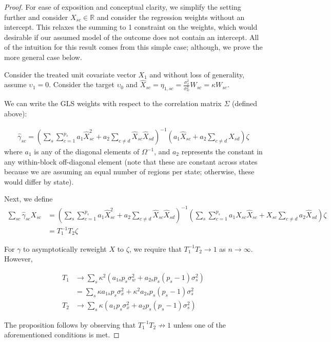 \begin{proof}
For ease of exposition and conceptual clarity, we simplify the setting further and consider $X_{sc} \in \mathbb{R}$ and consider the regression weights without an intercept. This relaxes the summing to 1 constraint on the weights, which would desirable if our assumed model of the outcome does not contain an intercept. All of the intuition for this result comes from this simple case; although, we prove the more general case below.

Consider the treated unit covariate vector $X_1$ and without loss of generality, assume $\upsilon_1 = 0$. Consider the target $\upsilon_0$ and $\hat{X}_{sc} = \eta_{1, sc} = \frac{\sigma^2_x}{\sigma^2_w}W_{sc} = \kappa W_{sc}$. 

We can write the GLS weights with respect to the correlation matrix $\Sigma$ (defined above):

\begin{align*}
\hat{\gamma}_{sc} = (\sum_{s}\sum_{c=1}^{p_s} a_{1} \hat{X}_{sc}^2 + a_{2} \sum_{c\ne d} \hat{X}_{sc}\hat{X}_{sd})^{-1}(a_{1}\hat{X}_{sc} + a_{2}\sum_{c\ne d} \hat{X}_{sd})\zeta
\end{align*}
%
where $a_1$ is any of the diagonal elements of $\Omega^{-1}$, and $a_2$ represents the constant in any within-block off-diagonal element (note that these are constant across states because we are assuming an equal number of regions per state; otherwise, these would differ by state).

Next, we define 
    \begin{align*}
        \sum_{sc} \hat{\gamma}_{sc} X_{sc} &= (\sum_{s}\sum_{c=1}^{p_s} a_{1} \hat{X}_{sc}^2 + a_{2} \sum_{c\ne d} \hat{X}_{sc}\hat{X}_{sd})^{-1}(\sum_{s}\sum_{c=1}^{p_s}a_{1}X_{sc}\hat{X}_{sc} + X_{sc}\sum_{c\ne d}a_{2}\hat{X}_{sd})\zeta \\
        &= T_1^{-1}T_2\zeta
    \end{align*}

For $\gamma$ to asymptotically reweight $X$ to $\zeta$, we require that $T_1^{-1}T_2 \to 1$ as $n \to \infty$. However,

    \begin{align*}
        T_1 &\to \sum_s \kappa^2 (a_{1s} p_s\sigma^2_w + a_{2s} p_s(p_s - 1)\sigma^2_s)\\
        &= \sum_s \kappa a_{1s} p_s\sigma^2_x + \kappa^2a_{2s}p_s(p_s - 1)\sigma^2_s \\
        T_2 &\to \sum_s \kappa (a_{1} p_s\sigma^2_x + a_{2}p_s(p_s - 1)\sigma^2_s)
    \end{align*}
    
 The proposition follows by observing that $T_1^{-1}T_2 \not\to 1$ unless one of the aforementioned conditions is met.
\end{proof}    
    
